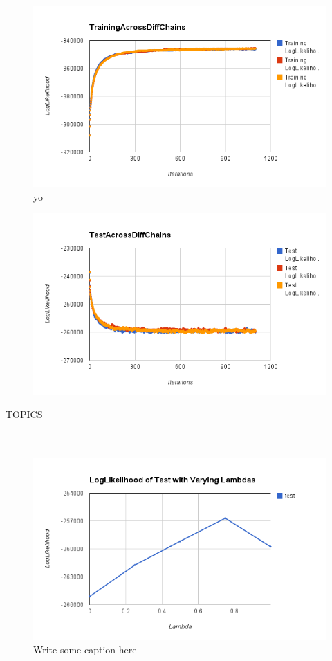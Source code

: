 \documentclass[12pt]{article}
\begin{document}
\begin{figure}[H]
\centering
\includegraphics[keepaspectratio=true,scale=0.8]{charts/trainingLLOfChains}yo
\label{chainTraining}
\end{figure}

\begin{figure}[H]
\centering
\includegraphics[keepaspectratio=true,scale=0.8]{charts/testLLOfChains}
\label{chainTest}
\end{figure}

 TOPICS \\
\\
\\
\begin{figure}[H]
\centering
\includegraphics[keepaspectratio=true,scale=0.8]{charts/VaryingLambdaOnTest}
\caption{Write some caption here}\label{lambdaVariation}
\end{figure}
\end{document}
